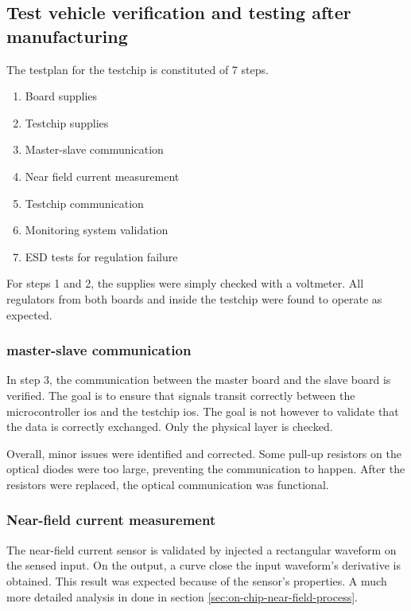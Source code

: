 \subsection{Test vehicle verification and testing after manufacturing}
\label{sec:test-vehicle-testing}

The testplan for the testchip is constituted of 7 steps.

\begin{enumerate}
\item Board supplies
\item Testchip supplies
\item Master-slave communication
\item Near field current measurement
\item Testchip communication
\item Monitoring system validation
\item ESD tests for regulation failure
\end{enumerate}

For steps 1 and 2, the supplies were simply checked with a voltmeter.
All regulators from both boards and inside the testchip were found to operate as expected.

\subsubsection{master-slave communication}

In step 3, the communication between the master board and the slave board is verified.
The goal is to ensure that signals transit correctly between the microcontroller \gls{io}s and the testchip \gls{io}s.
The goal is not however to validate that the data is correctly exchanged.
Only the physical layer is checked.

Overall, minor issues were identified and corrected.
Some pull-up resistors on the optical diodes were too large, preventing the communication to happen.
After the resistors were replaced, the optical communication was functional.

\subsubsection{Near-field current measurement}

The near-field current sensor is validated by injected a rectangular waveform on the sensed input.
On the output, a curve close the input waveform's derivative is obtained.
This result was expected because of the sensor's properties.
A much more detailed analysis in done in section \ref{sec:on-chip-near-field-process}.

